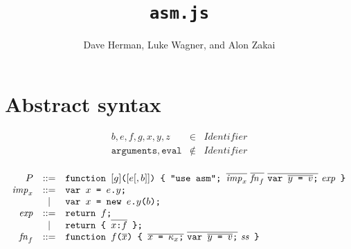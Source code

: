 \documentclass{article}
\newcommand{\funcall}[2]{{#1}\mathjs{(}{#2}\mathjs{)}}
\newcommand{\seq}[1]{\overline{{#1}}}
\newcommand{\mathjs}[1]{\mbox{\texttt{{#1}}}}
\newcommand{\return}[1]{\mathjs{return }{#1}\mathjs{;}}
\newcommand{\fun}[3]{\mathjs{function }{#1}\mathjs{(}{#2}\mathjs{) \char123{} }{#3}\mathjs{ \char125{}}}
\newcommand{\var}[1]{\mathjs{var }{#1}\mathjs{;}}
\begin{document}
\title{\texttt{asm.js}}
\author{Dave Herman, Luke Wagner, and Alon Zakai}
\maketitle

\section{Abstract syntax}

\[
\begin{array}{rcl}
b, e, f, g, x, y, z               & \in & \mathit{Identifier} \\
\mathtt{arguments}, \mathtt{eval} & \not\in & \mathit{Identifier} \\
\end{array}
\]

\[
\begin{array}{rcl}
P               & ::= & \fun{[g]}{[e[, b]]}{\mathjs{"use asm"; } \seq{\mathit{imp}_x}\ \seq{\mathit{fn}_f}\ \seq{\var{\seq{y \mathjs{ = } v}}}\ \mathit{exp}} \\
\mathit{imp}_x  & ::= & \var{x \mathjs{ = } e\mathjs{.}y} \\
                &  |  & \var{x \mathjs{ = } \mathjs{new }\funcall{e\mathjs{.}y}{b}} \\
\mathit{exp}    & ::= & \return{f} \\
                &  |  & \return{\mathjs{\char123{} } \seq{x \mathjs{:} f} \mathjs{ \char125{}}} \\
\mathit{fn}_f   & ::= & \fun{f}{\seq{x}}{\seq{x\mathjs{ = }\kappa_x\mathjs{;}}\ \seq{\var{\seq{y\mathjs{ = }v}}}\ \mathit{ss}} \\
\end{array}
\]
\end{document}
